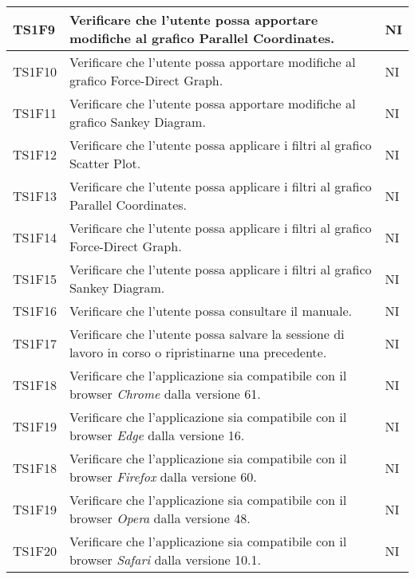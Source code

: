 \begin{center}
\begin{longtable}{|p{1.5cm}|p{11cm}|p{1cm}|}
            \rowcolor[HTML]{EFEFEF}
            TS1F9 & Verificare che l’utente possa apportare modifiche al grafico Parallel Coordinates. & NI\\ \hline
            \rowcolor[HTML]{C0C0C0}
            TS1F10 & Verificare che l’utente possa apportare modifiche al grafico Force-Direct Graph. & NI\\ \hline
            \rowcolor[HTML]{EFEFEF}
            TS1F11 & Verificare che l’utente possa apportare modifiche al grafico Sankey Diagram. & NI\\ \hline
            \rowcolor[HTML]{C0C0C0}
            TS1F12 & Verificare che l’utente possa applicare i filtri al grafico Scatter Plot. & NI\\ \hline
            \rowcolor[HTML]{EFEFEF}
            TS1F13 & Verificare che l’utente possa applicare i filtri al grafico Parallel Coordinates. & NI\\ \hline
            \rowcolor[HTML]{C0C0C0}
            TS1F14 & Verificare che l’utente possa applicare i filtri al grafico Force-Direct Graph. & NI\\ \hline
            \rowcolor[HTML]{EFEFEF}
            TS1F15 & Verificare che l’utente possa applicare i filtri al grafico Sankey Diagram. & NI\\ \hline
            \rowcolor[HTML]{C0C0C0}
            TS1F16 & Verificare che l’utente possa consultare il manuale. & NI\\ \hline
            \rowcolor[HTML]{EFEFEF}
            TS1F17 & Verificare che l’utente possa salvare la sessione di lavoro in corso o ripristinarne una precedente. & NI\\ \hline
            \rowcolor[HTML]{C0C0C0}
            TS1F18 & Verificare che l'applicazione sia compatibile con il browser \textit{Chrome} dalla versione 61. & NI\\ \hline
            \rowcolor[HTML]{EFEFEF}
            TS1F19 & Verificare che l'applicazione sia compatibile con il browser \textit{Edge} dalla versione 16. & NI\\ \hline
            \rowcolor[HTML]{C0C0C0}
            TS1F18 & Verificare che l'applicazione sia compatibile con il browser \textit{Firefox} dalla versione 60. & NI\\ \hline
            \rowcolor[HTML]{EFEFEF}
            TS1F19 & Verificare che l'applicazione sia compatibile con il browser \textit{Opera} dalla versione 48. & NI\\ \hline
            \rowcolor[HTML]{C0C0C0}
            TS1F20 & Verificare che l'applicazione sia compatibile con il browser \textit{Safari} dalla versione 10.1. & NI\\ \hline
        \end{longtable}
    \end{center}

